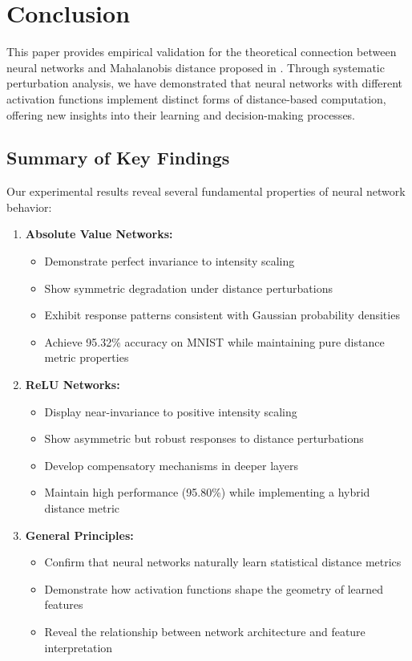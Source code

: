 \section{Conclusion}

This paper provides empirical validation for the theoretical connection between neural networks and Mahalanobis distance proposed in \citep{oursland2024interpreting}. Through systematic perturbation analysis, we have demonstrated that neural networks with different activation functions implement distinct forms of distance-based computation, offering new insights into their learning and decision-making processes.

\subsection{Summary of Key Findings}

Our experimental results reveal several fundamental properties of neural network behavior:

\begin{enumerate}
    \item \textbf{Absolute Value Networks:}
    \begin{itemize}
        \item Demonstrate perfect invariance to intensity scaling
        \item Show symmetric degradation under distance perturbations
        \item Exhibit response patterns consistent with Gaussian probability densities
        \item Achieve 95.32\% accuracy on MNIST while maintaining pure distance metric properties
    \end{itemize}

    \item \textbf{ReLU Networks:}
    \begin{itemize}
        \item Display near-invariance to positive intensity scaling
        \item Show asymmetric but robust responses to distance perturbations
        \item Develop compensatory mechanisms in deeper layers
        \item Maintain high performance (95.80\%) while implementing a hybrid distance metric
    \end{itemize}

    \item \textbf{General Principles:}
    \begin{itemize}
        \item Confirm that neural networks naturally learn statistical distance metrics
        \item Demonstrate how activation functions shape the geometry of learned features
        \item Reveal the relationship between network architecture and feature interpretation
    \end{itemize}
\end{enumerate}


